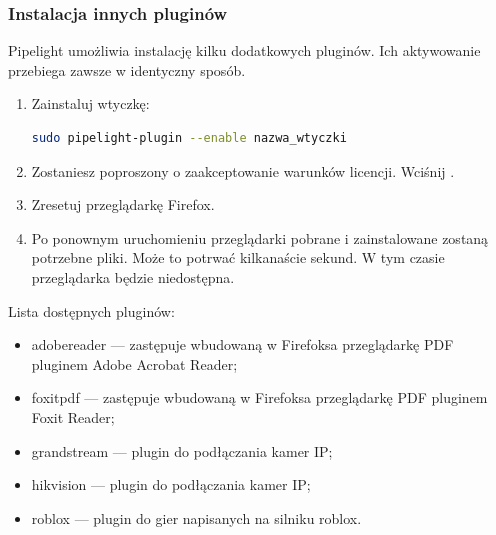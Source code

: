 \subsubsection{Instalacja innych pluginów}
\noindent Pipelight umożliwia instalację kilku dodatkowych pluginów. Ich aktywowanie przebiega zawsze w identyczny sposób.
\begin{enumerate}
\item Zainstaluj wtyczkę:
\begin{lstlisting}[language=bash]
sudo pipelight-plugin --enable nazwa_wtyczki
\end{lstlisting}
\item Zostaniesz poproszony o zaakceptowanie warunków licencji. Wciśnij .
\item Zresetuj przeglądarkę Firefox.
\item Po ponownym uruchomieniu przeglądarki pobrane i zainstalowane zostaną potrzebne pliki. Może to potrwać kilkanaście sekund. W tym czasie przeglądarka będzie niedostępna.
\end{enumerate}
Lista dostępnych pluginów:
\begin{itemize}
\item \textcolor{ubuntu_orange}{adobereader} --- zastępuje wbudowaną w Firefoksa przeglądarkę PDF pluginem Adobe Acrobat Reader;
\item \textcolor{ubuntu_orange}{foxitpdf} --- zastępuje wbudowaną w Firefoksa przeglądarkę PDF pluginem Foxit Reader;
\item \textcolor{ubuntu_orange}{grandstream} --- plugin do podłączania kamer IP;
\item \textcolor{ubuntu_orange}{hikvision} --- plugin do podłączania kamer IP;
\item \textcolor{ubuntu_orange}{roblox} --- plugin do gier napisanych na silniku roblox.
\end{itemize}

